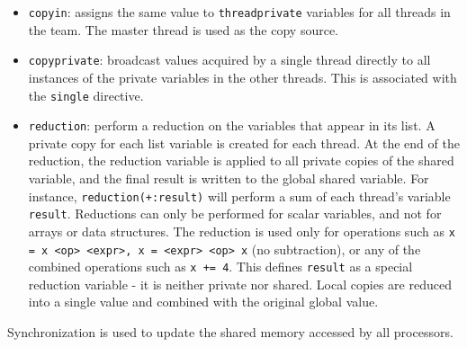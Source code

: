 \documentclass[10pt]{article}
\newcounter{subsubsubsection}[subsubsection]
\begin{document}
\begin{flushleft}
\begin{itemize}
\item {\tt copyin}: assigns the same value to {\tt threadprivate} variables for all threads in the team. The master thread is used as the copy source. 
\item {\tt copyprivate}: broadcast values acquired by a single thread directly to all instances of the private variables in the other threads. This is associated with the {\tt single} directive. 
\item {\tt reduction}: perform a reduction on the variables that appear in its list. A private copy for each list variable is created for each thread. At the end of the reduction, the reduction variable is applied to all private copies of the shared variable, and the final result is written to the global shared variable. For instance, {\tt reduction(+:result)} will perform a sum of each thread's variable {\tt result}. Reductions can only be performed for scalar variables, and not for arrays or data structures. The reduction is used only for operations such as {\tt x = x <op> <expr>, x = <expr> <op> x} (no subtraction), or any of the combined operations such as {\tt x += 4}. This defines {\tt result} as a special reduction variable - it is neither private nor shared. Local copies are reduced into a single value and combined with the original global value.
\end{itemize}


Synchronization is used to update the shared memory accessed by all processors. 


\end{flushleft}
\end{document}
